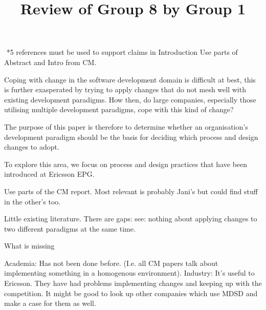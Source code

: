 \documentclass[times, 10pt,twocolumn]{IEEEtran}
\begin{document}
\title{Review of Group 8 by Group 1}

\author{


}


\maketitle
\thispagestyle{empty}







​
*5 references must be used to support claims in Introduction
Use parts of Abstract and Intro from CM. 

Coping with change in the software development domain is difficult at best, this is further exasperated by trying to apply changes that do not mesh well with existing development paradigms. How then, do large companies, especially those utilising multiple development paradigms, cope with this kind of change?

The purpose of this paper is therefore to determine whether an organisation's development paradigm should be the basis for deciding which process and design changes to adopt. 

To explore this area, we focus on process and design practices that have been introduced at Ericsson EPG.


Use parts of the CM report. 
Most relevant is probably Jani's but could find stuff in the other's too. 

Little existing literature.
There are gaps: see: nothing about applying changes to two different paradigms at the same time.

What is missing

Academia: Has not been done before. (I.e. all CM papers talk about implementing something in a homogenous environment). 
Industry: It's useful to Ericsson. They have had problems implementing changes and keeping up with the competition. It might be good to look up other companies which use MDSD and make a case for them as well. 
\end{document}
